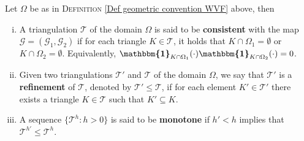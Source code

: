 \documentclass[3p]{elsarticle}
\def\triang{\mathcal{T}}
\def\map{\mathcal{G} }%
\def\mapone{\mathcal{G}_{1} }%
\def\maptwo{\mathcal{G}_{2}} %
\def\Omeone{\Omega_{1}}
\def\Ometwo{\Omega_{2}}
\def\ind{\boldsymbol{\mathbbm{1}}}
\begin{document}
\begin{definition}\label{Def Consistent Grid}
Let $\Omega$ be as in \textsc{Definition} \ref{Def geometric convention WVF} above, then 
%
\begin{enumerate}[(i)]
   \item A triangulation $\triang$ of the domain $\Omega$ is said to be \textbf{consistent} with the map $\map = (\mapone, \maptwo)$ if for each triangle $K\in \triang$, it holds that $K\cap \Omeone = \emptyset$ or $K\cap \Ometwo = \emptyset$. Equivalently, $\ind_{K\cap \Omega_{1}}(\cdot) \ind_{K\cap \Omega_{2}}(\cdot) = 0$. 
   
   \item Given two triangulations $\triang'$ and $\triang$ of the domain $\Omega$, we say that $\triang '$ is a \textbf{refinement} of $\triang$, denoted by $\triang ' \leq \triang$, if for each element $K ' \in \triang '$ there exists a triangle $K\in \triang$ such that $K' \subseteq K$. 
   
   \item A sequence $\{\triang^{h}: h>0 \}$ is said to be \textbf{monotone} if $h' < h$ implies that $\triang^{h'}\leq \triang^{h}$.
\end{enumerate}
%
\end{definition}
%
%
%
%
%
%
\end{document}
